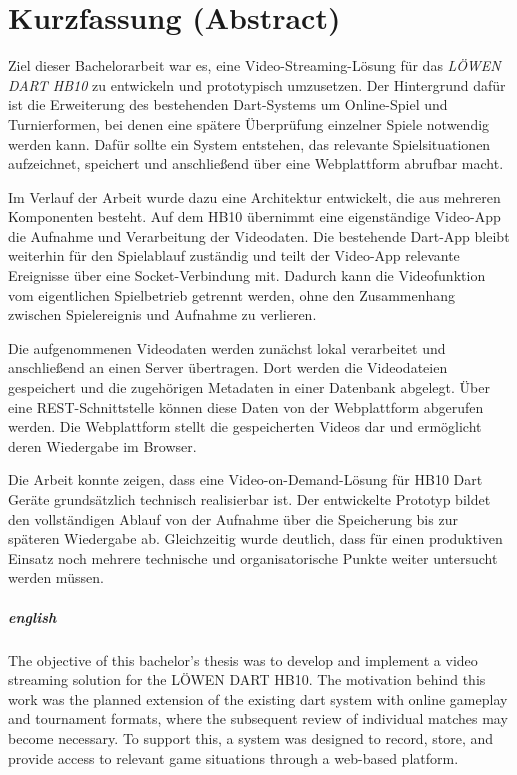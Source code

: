 \chapter*{Kurzfassung (Abstract)}

Ziel dieser Bachelorarbeit war es, eine Video-Streaming-Lösung für das \textit{LÖWEN DART HB10} zu entwickeln und prototypisch umzusetzen. Der Hintergrund dafür ist die Erweiterung des bestehenden Dart-Systems um Online-Spiel und Turnierformen, 
bei denen eine spätere Überprüfung einzelner Spiele notwendig werden kann. Dafür sollte ein System entstehen, das relevante Spielsituationen aufzeichnet, speichert und anschließend über eine Webplattform abrufbar macht. 

Im Verlauf der Arbeit wurde dazu eine Architektur entwickelt, die aus mehreren Komponenten besteht. Auf dem HB10 übernimmt eine eigenständige Video-App die Aufnahme und Verarbeitung der Videodaten. 
Die bestehende Dart-App bleibt weiterhin für den Spielablauf zuständig und teilt der Video-App relevante Ereignisse über eine Socket-Verbindung mit. Dadurch kann die Videofunktion vom eigentlichen Spielbetrieb getrennt werden, ohne den Zusammenhang zwischen Spielereignis und Aufnahme zu verlieren. 

Die aufgenommenen Videodaten werden zunächst lokal verarbeitet und anschließend an einen Server übertragen. Dort werden die Videodateien gespeichert und die zugehörigen Metadaten in einer Datenbank abgelegt. Über eine REST-Schnittstelle können diese Daten von der Webplattform abgerufen werden. 
Die Webplattform stellt die gespeicherten Videos dar und ermöglicht deren Wiedergabe im Browser. 

Die Arbeit konnte zeigen, dass eine Video-on-Demand-Lösung für HB10 Dart Geräte grundsätzlich technisch realisierbar ist. Der entwickelte Prototyp bildet den vollständigen Ablauf von der Aufnahme über die Speicherung bis zur späteren Wiedergabe ab. Gleichzeitig wurde deutlich, 
dass für einen produktiven Einsatz noch mehrere technische und organisatorische Punkte weiter untersucht werden müssen. 

\paragraph*{english}

The objective of this bachelor's thesis was to develop and implement a video streaming solution for the LÖWEN DART HB10. The motivation behind this work was the planned extension of the existing dart system with online gameplay and tournament formats, where the subsequent review of individual matches may become necessary. 
To support this, a system was designed to record, store, and provide access to relevant game situations through a web-based platform.

